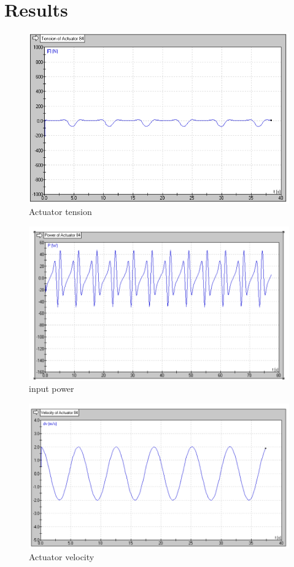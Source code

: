 \documentclass{article}
\begin{document}
\newpage
\section*{Results}

\begin{figure}[H]
    \centering
    \includegraphics[width=0.7\linewidth]{Images/ac tension.png}
    \caption{Actuator tension}
\end{figure}

\begin{figure}[H]
    \centering
    \includegraphics[width=0.7\linewidth]{Images/input power.png}
    \caption{input power}
\end{figure}

\begin{figure}[H]
    \centering
    \includegraphics[width=0.7\linewidth]{Images/ac velocity.png}
    \caption{Actuator velocity}
\end{figure}
\end{document}
